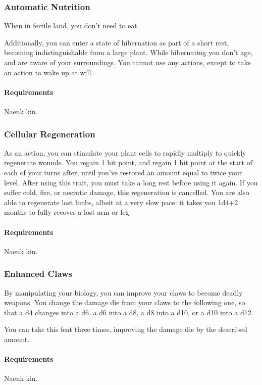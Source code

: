     \subsubsection{Automatic Nutrition} \label{feat::automaticnutrition}
        When in fertile land, you don't need to eat.

        Additionally, you can enter a state of hibernation as part of a short rest, becoming indistinguishable from a large plant.
        While hibernating you don't age, and are aware of your surroundings.
        You cannot use any actions, except to take an action to wake up at will.
        \paragraph{Requirements} Naenk kin.
    \subsubsection{Cellular Regeneration} \label{feat::cellularregeneration}
        As an action, you can stimulate your plant cells to rapidly multiply to quickly regenerate wounds.
        You regain 1 hit point, and regain 1 hit point at the start of each of your turns after, until you've restored an amount equal to twice your level.
        After using this trait, you must take a long rest before using it again.
        If you suffer cold, fire, or necrotic damage, this regeneration is cancelled.
        You are also able to regenerate lost limbs, albeit at a very slow pace: it takes you 1d4+2 months to fully recover a lost arm or leg.
        \paragraph{Requirements} Naenk kin.
    \subsubsection{Enhanced Claws} \label{feat::enhancedclaws}
        By manipulating your biology, you can improve your claws to become deadly weapons.
        You change the damage die from your claws to the following one, so that a d4 changes into a d6, a d6 into a d8, a d8 into a d10, or a d10 into a d12.

        You can take this feat three times, improving the damage die by the described amount.
        \paragraph{Requirements} Naenk kin.
